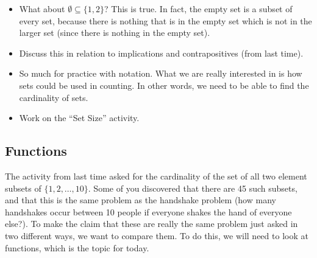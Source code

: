 \documentclass[12pt]{article}
\theoremstyle{plain}
\theoremstyle{definition}
\theoremstyle{remark}
\newcommand{\todayis}[1]{\clearpage{\rhead{\footnotesize #1}}}
\begin{document}
\begin{itemize}
\item What about $\emptyset \subseteq \{1,2\}$?  This is true.  In fact, the empty set is a subset of every set, because there is nothing that is in the empty set which is not in the larger set (since there is nothing in the empty set).

\item Discuss this in relation to implications and contrapositives (from last time).

\item So much for practice with notation.  What we are really interested in is how sets could be used in counting.  In other words, we need to be able to find the cardinality of sets.

\item Work on the ``Set Size'' activity.
\end{itemize}


\todayis{Monday, August 28}

\subsection*{Functions}
The activity from last time asked for the cardinality of the set of all two element subsets of $\{1, 2,\ldots, 10\}$.  Some of you discovered that there are 45 such subsets, and that this is the same problem as the handshake problem (how many handshakes occur between 10 people if everyone shakes the hand of everyone else?).  To make the claim that these are really the same problem just asked in two different ways, we want to compare them.  To do this, we will need to look at functions, which is the topic for today.
\end{document}
